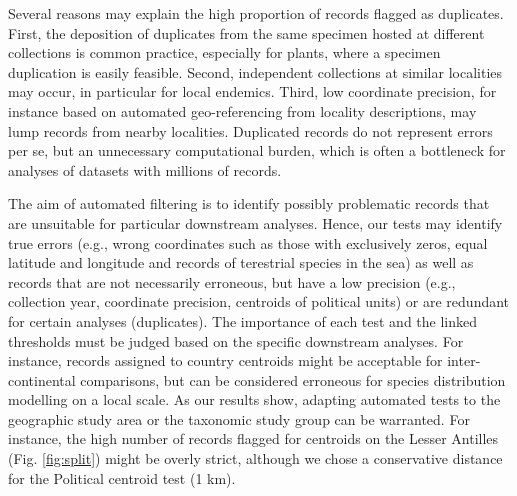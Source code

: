 \documentclass[fleqn,10pt,lineno]{wlpeerj} %
\begin{document}
Several reasons may explain the high proportion of records flagged as duplicates. First, the deposition of duplicates from the same specimen hosted at different collections is common practice, especially for plants, where a specimen duplication is easily feasible. Second, independent collections at similar localities may occur, in particular for local endemics. Third, low coordinate precision, for instance based on automated geo-referencing from locality descriptions, may lump records from nearby localities. Duplicated records do not represent errors per se, but an unnecessary computational burden, which is often a bottleneck for analyses of datasets with millions of records.

The aim of automated filtering is to identify possibly problematic records that are unsuitable for particular downstream analyses. Hence, our tests may identify true errors (e.g., wrong coordinates such as those with exclusively zeros, equal latitude and longitude and records of terestrial species in the sea) as well as records that are not necessarily erroneous, but have a low precision (e.g., collection year, coordinate precision, centroids of political units) or are redundant for certain analyses (duplicates). The importance of each test and the linked thresholds must be judged based on the specific downstream analyses. For instance, records assigned to country centroids might be acceptable for inter-continental comparisons, but can be considered erroneous for species distribution modelling on a local scale. As our results show, adapting automated tests to the geographic study area or the taxonomic study group can be warranted. For instance, the high number of records flagged for centroids on the Lesser Antilles (Fig. \ref{fig:split}) might be overly strict, although we chose a conservative distance for the Political centroid test (1 km).
\end{document}
